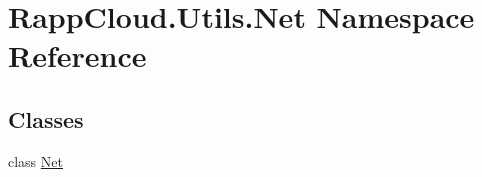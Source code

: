 \hypertarget{namespaceRappCloud_1_1Utils_1_1Net}{\section{Rapp\-Cloud.\-Utils.\-Net Namespace Reference}
\label{namespaceRappCloud_1_1Utils_1_1Net}
}
\subsection*{Classes}
\begin{DoxyCompactItemize}
\item 
class \hyperlink{classRappCloud_1_1Utils_1_1Net_1_1Net}{Net}
\end{DoxyCompactItemize}
